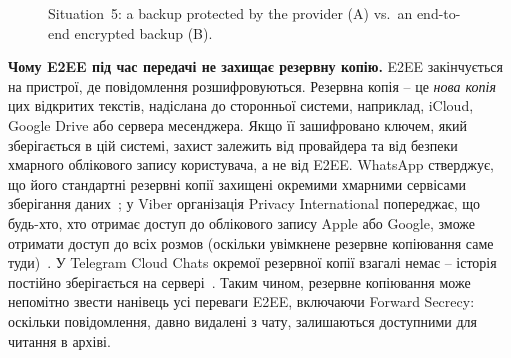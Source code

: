 \begin{figure}[H]
    \centering
    \caption{Situation~5: a backup protected by the provider (A) vs.\ an end-to-end encrypted backup (B).}
    \label{fig:s5}
\end{figure}

\textbf{Чому E2EE під час передачі не захищає резервну копію.} E2EE закінчується на пристрої, де повідомлення 
розшифровуються. Резервна копія -- це \textit{нова копія} цих відкритих текстів, надіслана до сторонньої системи, 
наприклад, iCloud, Google Drive або сервера месенджера. Якщо її зашифровано ключем, який зберігається в цій системі, 
захист залежить від провайдера та від безпеки хмарного облікового запису користувача, а не від E2EE. WhatsApp стверджує, 
що його стандартні резервні копії захищені окремими хмарними сервісами зберігання даних~\cite{whatsapp_e2ee_backups}; 
у Viber організація Privacy International попереджає, що будь-хто, хто отримає доступ до облікового запису Apple або Google, 
зможе отримати доступ до всіх розмов (оскільки увімкнене резервне копіювання саме туди)~\cite{pi_viber}. У Telegram 
Cloud Chats окремої резервної копії взагалі немає -- історія постійно зберігається на сервері~\cite{telegram_faq}. 
Таким чином, резервне копіювання може непомітно звести нанівець усі переваги E2EE, включаючи Forward Secrecy: 
оскільки повідомлення, давно видалені з чату, залишаються доступними для читання в архіві.

